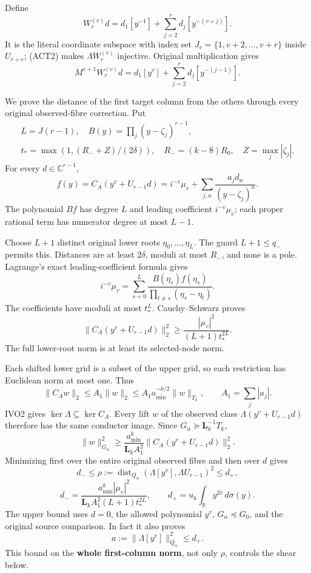 \documentclass[11pt]{article}
\begin{document}
Define \[
W_r^{(v)}d=d_1[y^{-1}]+\sum_{j=2}^rd_j[y^{-(v+j)}].
\] It is the literal coordinate subspace with index set \(J_v=\{1,v+2,\ldots,v+r\}\) inside \(U_{r+v}\); (ACT2) makes \(\Lambda W_r^{(v)}\) injective. Original multiplication gives \[
M^{v+1}W_r^{(v)}d=d_1[y^v]+\sum_{j=2}^rd_j[y^{-(j-1)}].
\tag{ACT22}
\]

We prove the distance of the first target column from the others through every original observed-fibre correction. Put \[
\begin{gathered}
L=J(r-1),\quad B(y)=\prod_j(y-\zeta_j)^{r-1},\\
t_*=\max(1,(R_-+Z)/(2\delta)),\quad R_-=(k-8)R_0,\quad Z=\max_j|\zeta_j|.
\end{gathered}
\] For every \(d\in\mathbb C^{r-1}\), \[
f(y)=C_A(y^v+U_{r-1}d)=i^{-v}\mu_v+
 \sum_{j,n}\frac{a_jd_n}{(y-\zeta_j)^n}.
\] The polynomial \(Bf\) has degree \(L\) and leading coefficient \(i^{-v}\mu_v\); each proper rational term has numerator degree at most \(L-1\).

Choose \(L+1\) distinct original lower roots \(\eta_0,\ldots,\eta_L\). The guard \(L+1\le q_-\) permits this. Distances are at least \(2\delta\), moduli at most \(R_-\), and none is a pole. Lagrange's exact leading-coefficient formula gives \[
i^{-v}\mu_v=\sum_{s=0}^L
 \frac{B(\eta_s)f(\eta_s)}{\prod_{t\ne s}(\eta_s-\eta_t)}.
\] The coefficients have moduli at most \(t_*^L\). Cauchy--Schwarz proves \[
\|C_A(y^v+U_{r-1}d)\|_2^2
\ge\frac{|\mu_v|^2}{(L+1)t_*^{2L}}.
\tag{ACT23}
\] The full lower-root norm is at least its selected-node norm.

Each shifted lower grid is a subset of the upper grid, so each restriction has Euclidean norm at most one. Thus \[
\|C_Aw\|_2\le A_1\|w\|_2\le A_1a_{\min}^{-k/2}\|w\|_{T_k},
\qquad A_1=\sum_j|a_j|.
\] IVO2 gives \(\ker\Lambda\subseteq\ker C_A\). Every lift \(w\) of the observed class \(\Lambda(y^v+U_{r-1}d)\) therefore has the same conductor image. Since \(G_\alpha\succeq\mathbf L_k^{-1}T_k\), \[
\|w\|_{G_\alpha}^2\ge
\frac{a_{\min}^k}{\mathbf L_kA_1^2}\|C_A(y^v+U_{r-1}d)\|_2^2.
\] Minimizing first over the entire original observed fibre and then over \(d\) gives \[
d_-\le\rho:=
\operatorname{dist}_{Q_\alpha}(\Lambda[y^v],\Lambda U_{r-1})^2\le d_+,
\tag{ACT24}
\] \[
d_-=\frac{a_{\min}^k|\mu_v|^2}
 {\mathbf L_kA_1^2(L+1)t_*^{2L}},\qquad
d_+=u_k\int_\mathbb R y^{2v}\,d\sigma(y).
\] The upper bound uses \(d=0\), the allowed polynomial \(y^v\), \(G_\alpha\preceq G_0\), and the original source comparison. In fact it also proves \[
a:=\|\Lambda[y^v]\|_{Q_\alpha}^2\le d_+.
\tag{ACT25}
\] This bound on the \textbf{whole first-column norm}, not only \(\rho\), controls the shear below.
\end{document}

